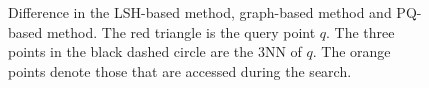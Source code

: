 \documentclass[11pt]{article}
\begin{document}
\begin{figure}[t]
{\begin{minipage}[c]{0.32\linewidth}
			\vspace{0.5em}
		\end{minipage}
	}
	\vspace{-0.5em}
	\caption{Difference in the LSH-based method, graph-based method and PQ-based method. The red triangle is the query point $q$. The three points in the black dashed circle are the $3$NN of $q$. The orange points denote those that are accessed during the search. 
 } 
	\label{bolong_fig:compare}
\end{figure}
\end{document}
